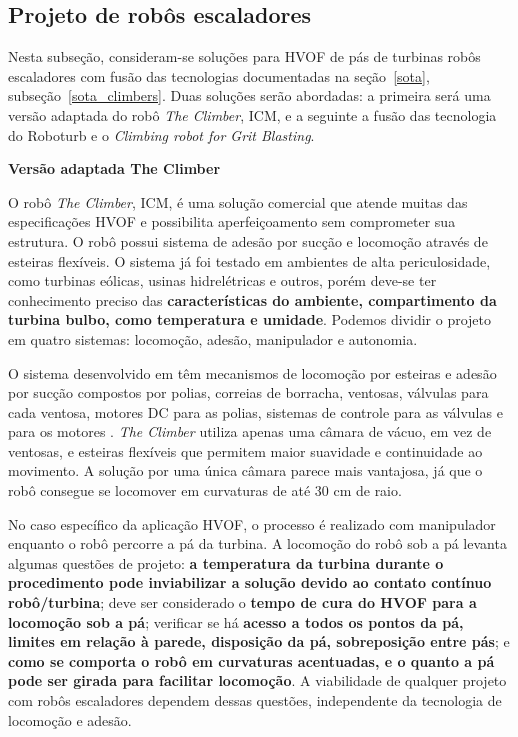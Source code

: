 \subsection{Projeto de robôs escaladores}\label{proj_climbers}

Nesta subseção, consideram-se soluções para HVOF de pás de turbinas robôs
escaladores com fusão das tecnologias documentadas na
seção~\ref{sota}, subseção~\ref{sota_climbers}. Duas soluções serão abordadas:
a primeira será uma versão adaptada do robô \emph{The Climber}, ICM, e a
seguinte a fusão das tecnologia do Roboturb e o \emph{Climbing robot for Grit
Blasting}.

\textbf{Versão adaptada The Climber}  

O robô \emph{The Climber}, ICM, é uma solução comercial que atende muitas das
especificações HVOF e possibilita aperfeiçoamento sem comprometer sua
estrutura. O robô possui sistema de adesão por sucção e locomoção através de
esteiras flexíveis. O sistema já foi testado em ambientes de alta
periculosidade, como turbinas eólicas, usinas hidrelétricas e outros, porém
deve-se ter conhecimento preciso das \textbf{características do ambiente,
compartimento da turbina bulbo, como temperatura e umidade}. Podemos dividir o
projeto em quatro sistemas: locomoção, adesão, manipulador e autonomia.

O sistema desenvolvido em \cite{kim2008development} têm mecanismos de
locomoção por esteiras e adesão por sucção compostos por polias, correias de
borracha, ventosas, válvulas para cada ventosa, motores DC para as polias,
sistemas de controle para as válvulas e para os motores . \emph{The Climber}
utiliza apenas uma câmara de vácuo, em vez de ventosas, e esteiras flexíveis que
permitem maior suavidade e continuidade ao movimento. A solução por uma única
câmara parece mais vantajosa, já que o robô consegue se locomover em curvaturas
de até 30 cm de raio.

No caso específico da aplicação HVOF, o processo é realizado com
manipulador enquanto o robô percorre a pá da turbina. A locomoção do
robô sob a pá levanta algumas questões de projeto: \textbf{a
temperatura da turbina durante o procedimento pode inviabilizar a solução devido ao contato
contínuo robô/turbina}; deve ser considerado o \textbf{tempo de cura do HVOF
para a locomoção sob a pá}; verificar se há \textbf{acesso a todos os
pontos da pá, limites em relação à parede, disposição da pá, sobreposição entre
pás}; e \textbf{como se comporta o robô em curvaturas acentuadas, e
o quanto a pá pode ser girada para facilitar locomoção}. A viabilidade de
qualquer projeto com robôs escaladores dependem dessas questões, independente da
tecnologia de locomoção e adesão.

